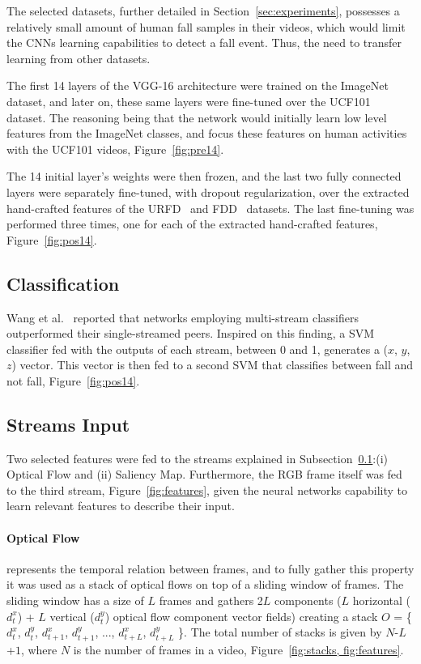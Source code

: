 \documentclass[conference]{IEEEtran}
\begin{document}
The selected datasets, further detailed in Section~\ref{sec:experiments}, possesses a relatively small amount of human fall samples in their videos, which would limit the CNNs learning capabilities to detect a fall event. Thus, the need to transfer learning from other datasets.

The first 14 layers of the VGG-16 architecture were trained on the ImageNet~\cite{imagenet_cvpr09} dataset, and later on, these same layers were fine-tuned over the UCF101~\cite{soomro2012ucf101} dataset. The reasoning being that the network would initially learn low level features from the ImageNet classes, and focus these features on human activities with the UCF101 videos, Figure~\ref{fig:pre14}.

The 14 initial layer's weights were then frozen, and the last two fully connected layers were separately fine-tuned, with dropout regularization, over the extracted hand-crafted features of the URFD~\cite{kepski2014human} and FDD~\cite{charfi2013optimised} datasets. The last fine-tuning was performed three times, one for each of the extracted hand-crafted features, Figure~\ref{fig:pos14}.

\subsection{Classification}
\label{sec:classification}

Wang et al.~\cite{wang2015towards} reported that networks employing multi-stream classifiers outperformed their single-streamed peers. Inspired on this finding, a SVM classifier fed with the outputs of each stream, between 0 and 1, generates a ($x$, $y$, $z$) vector. This vector is then fed to a second SVM that classifies between fall and not fall, Figure~\ref{fig:pos14}.

\subsection{Streams Input}

Two selected features were fed to the streams explained in Subsection~\ref{sec:classification}:(i) Optical Flow and (ii) Saliency Map. Furthermore, the RGB frame itself was fed to the third stream, Figure~\ref{fig:features}, given the neural networks capability to learn relevant features to describe their input.

\paragraph{Optical Flow} represents the temporal relation between frames, and to fully gather this property it was used as a stack of optical flows on top of a sliding window of frames. The sliding window has a size of $L$ frames and gathers 2$L$ components ($L$ horizontal ($d_t^x$) + $L$ vertical ($d_t^y$) optical flow component vector fields) creating a stack $O$ = \{$d_t^x$, $d_t^y$, $d_{t+1}^x$, $d_{t+1}^y$, ..., $d_{t+L}^x$, $d_{t+L}^y$ \}. The total number of stacks is given by $N$-$L$+$1$, where $N$ is the number of frames in a video, Figure~\ref{fig:stacks, fig:features}. 
\end{document}
